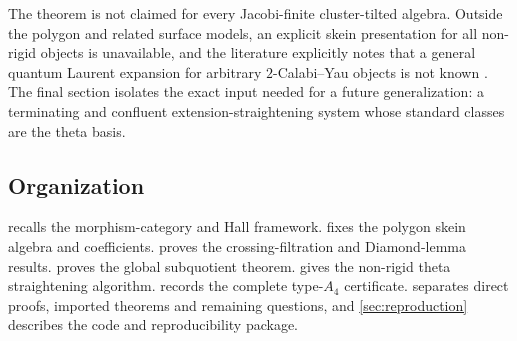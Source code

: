 The theorem is not claimed for every Jacobi-finite cluster-tilted algebra.
Outside the polygon and related surface models, an explicit skein presentation
for all non-rigid objects is unavailable, and the literature explicitly notes
that a general quantum Laurent expansion for arbitrary $2$-Calabi--Yau
objects is not known \cite{XiaoXuYang}.  The final section isolates the exact
input needed for a future generalization: a terminating and confluent
extension-straightening system whose standard classes are the theta basis.

\subsection*{Organization}

 recalls the morphism-category and Hall framework.
 fixes the polygon skein algebra and coefficients.
 proves the crossing-filtration and Diamond-lemma results.
 proves the global subquotient theorem.
 gives the non-rigid theta straightening algorithm.
 records the complete type-$A_4$ certificate.
 separates direct proofs, imported theorems and remaining
questions, and \cref{sec:reproduction} describes the code and reproducibility
package.
